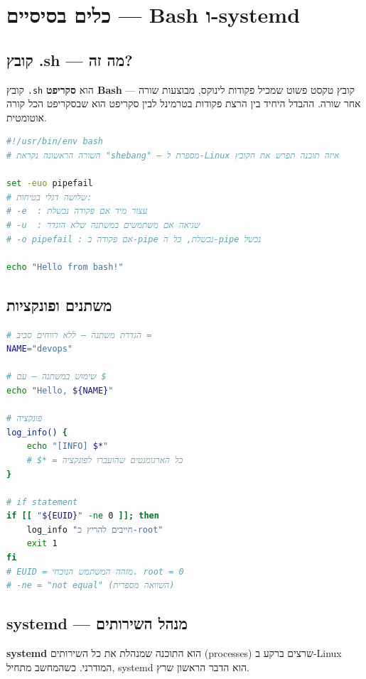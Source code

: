 \documentclass[12pt,a4paper]{article}
\begin{document}
\newpage
\section{כלים בסיסיים — Bash ו-systemd}

\subsection{קובץ .sh — מה זה?}

קובץ \texttt{.sh} הוא \textbf{סקריפט Bash} — קובץ טקסט פשוט שמכיל פקודות לינוקס, מבוצעות שורה אחר שורה. ההבדל היחיד בין הרצת פקודות בטרמינל לבין סקריפט הוא שבסקריפט הכל קורה אוטומטית.

\begin{lstlisting}[language=bash, caption={מבנה סקריפט בסיסי}]
#!/usr/bin/env bash
# השורה הראשונה נקראת "shebang" — מספרת ל-Linux איזה תוכנה תפרש את הקובץ

set -euo pipefail
# שלושה דגלי בטיחות:
# -e  : עצור מיד אם פקודה נכשלת
# -u  : שגיאה אם משתמשים במשתנה שלא הוגדר
# -o pipefail : אם פקודה ב-pipe נכשלת, כל ה-pipe נכשל

echo "Hello from bash!"
\end{lstlisting}

\subsection{משתנים ופונקציות}

\begin{lstlisting}[language=bash, caption={משתנים, פונקציות ו-if ב-Bash}]
# הגדרת משתנה — ללא רווחים סביב =
NAME="devops"

# שימוש במשתנה — עם $
echo "Hello, ${NAME}"

# פונקציה
log_info() {
    echo "[INFO] $*"
    # $* = כל הארגומנטים שהועברו לפונקציה
}

# if statement
if [[ "${EUID}" -ne 0 ]]; then
    log_info "חייבים להריץ כ-root"
    exit 1
fi
# EUID = מזהה המשתמש הנוכחי. root = 0
# -ne = "not equal" (השוואה מספרית)
\end{lstlisting}

\subsection{systemd — מנהל השירותים}

\textbf{systemd} הוא התוכנה שמנהלת את כל השירותים (processes) שרצים ברקע ב-Linux המודרני. כשהמחשב מתחיל, systemd הוא הדבר הראשון שרץ.
\end{document}
